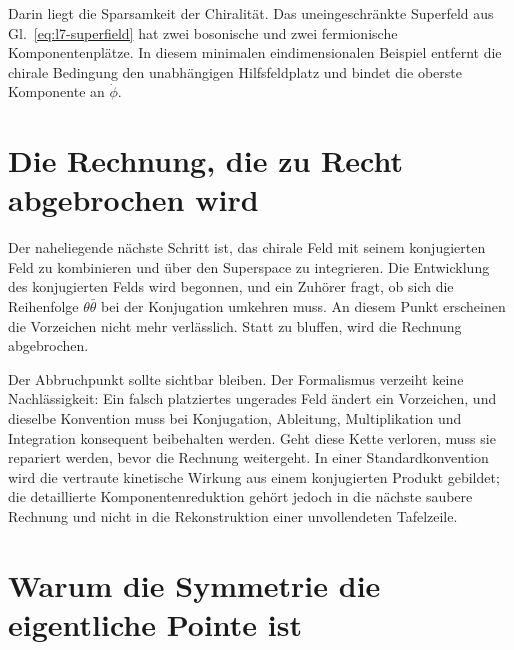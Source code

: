 Darin liegt die Sparsamkeit der Chiralität. Das uneingeschränkte Superfeld aus Gl.~\eqref{eq:l7-superfield} hat zwei bosonische und zwei fermionische Komponentenplätze. In diesem minimalen eindimensionalen Beispiel entfernt die chirale Bedingung den unabhängigen Hilfsfeldplatz und bindet die oberste Komponente an \(\dot\phi\).

\section{Die Rechnung, die zu Recht abgebrochen wird}

Der naheliegende nächste Schritt ist, das chirale Feld mit seinem konjugierten Feld zu kombinieren und über den Superspace zu integrieren. Die Entwicklung des konjugierten Felds wird begonnen, und ein Zuhörer fragt, ob sich die Reihenfolge \(\theta\bar\theta\) bei der Konjugation umkehren muss. An diesem Punkt erscheinen die Vorzeichen nicht mehr verlässlich. Statt zu bluffen, wird die Rechnung abgebrochen.

\begin{classroomqa}
\end{classroomqa}

Der Abbruchpunkt sollte sichtbar bleiben. Der Formalismus verzeiht keine Nachlässigkeit: Ein falsch platziertes ungerades Feld ändert ein Vorzeichen, und dieselbe Konvention muss bei Konjugation, Ableitung, Multiplikation und Integration konsequent beibehalten werden. Geht diese Kette verloren, muss sie repariert werden, bevor die Rechnung weitergeht. In einer Standardkonvention wird die vertraute kinetische Wirkung aus einem konjugierten Produkt gebildet; die detaillierte Komponentenreduktion gehört jedoch in die nächste saubere Rechnung und nicht in die Rekonstruktion einer unvollendeten Tafelzeile.

\section{Warum die Symmetrie die eigentliche Pointe ist}

